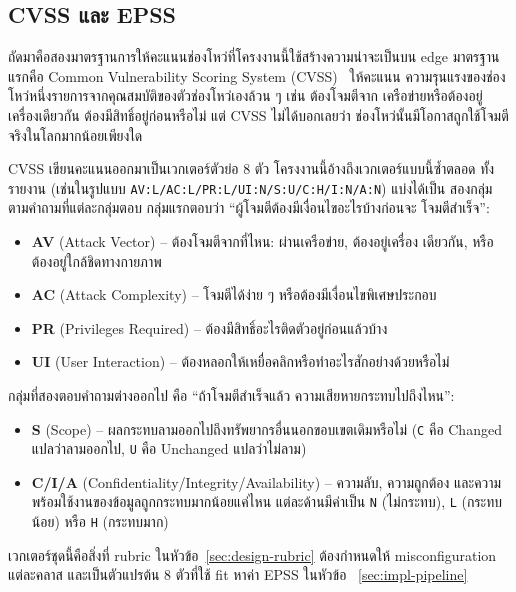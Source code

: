 \subsection{CVSS และ EPSS}\label{sec:theory-cvss-epss}

ถัดมาคือสองมาตรฐานการให้คะแนนช่องโหว่ที่โครงงานนี้ใช้สร้างความน่าจะเป็นบน edge
มาตรฐานแรกคือ Common Vulnerability Scoring System (CVSS)~\cite{cvss31} ให้คะแนน
ความรุนแรงของช่องโหว่หนึ่งรายการจากคุณสมบัติของตัวช่องโหว่เองล้วน ๆ เช่น ต้องโจมตีจาก
เครือข่ายหรือต้องอยู่เครื่องเดียวกัน ต้องมีสิทธิ์อยู่ก่อนหรือไม่ แต่ CVSS ไม่ได้บอกเลยว่า
ช่องโหว่นั้นมีโอกาสถูกใช้โจมตีจริงในโลกมากน้อยเพียงใด

CVSS เขียนคะแนนออกมาเป็นเวกเตอร์ตัวย่อ 8 ตัว โครงงานนี้อ้างถึงเวกเตอร์แบบนี้ซ้ำตลอด
ทั้งรายงาน (เช่นในรูปแบบ \texttt{AV:L/AC:L/PR:L/UI:N/S:U/C:H/I:N/A:N}) แบ่งได้เป็น
สองกลุ่มตามคำถามที่แต่ละกลุ่มตอบ กลุ่มแรกตอบว่า ``ผู้โจมตีต้องมีเงื่อนไขอะไรบ้างก่อนจะ
โจมตีสำเร็จ'':

\begin{itemize}[leftmargin=1.6em]
\item \textbf{AV} (Attack Vector) -- ต้องโจมตีจากที่ไหน: ผ่านเครือข่าย, ต้องอยู่เครื่อง
เดียวกัน, หรือต้องอยู่ใกล้ชิดทางกายภาพ
\item \textbf{AC} (Attack Complexity) -- โจมตีได้ง่าย ๆ หรือต้องมีเงื่อนไขพิเศษประกอบ
\item \textbf{PR} (Privileges Required) -- ต้องมีสิทธิ์อะไรติดตัวอยู่ก่อนแล้วบ้าง
\item \textbf{UI} (User Interaction) -- ต้องหลอกให้เหยื่อคลิกหรือทำอะไรสักอย่างด้วยหรือไม่
\end{itemize}

กลุ่มที่สองตอบคำถามต่างออกไป คือ ``ถ้าโจมตีสำเร็จแล้ว ความเสียหายกระทบไปถึงไหน'':

\begin{itemize}[leftmargin=1.6em]
\item \textbf{S} (Scope) -- ผลกระทบลามออกไปถึงทรัพยากรอื่นนอกขอบเขตเดิมหรือไม่
(\texttt{C} คือ Changed แปลว่าลามออกไป, \texttt{U} คือ Unchanged แปลว่าไม่ลาม)
\item \textbf{C/I/A} (Confidentiality/Integrity/Availability) -- ความลับ, ความถูกต้อง
และความพร้อมใช้งานของข้อมูลถูกกระทบมากน้อยแค่ไหน แต่ละด้านมีค่าเป็น \texttt{N}
(ไม่กระทบ), \texttt{L} (กระทบน้อย) หรือ \texttt{H} (กระทบมาก)
\end{itemize}

เวกเตอร์ชุดนี้คือสิ่งที่ rubric ในหัวข้อ~\ref{sec:design-rubric} ต้องกำหนดให้
misconfiguration แต่ละคลาส และเป็นตัวแปรต้น 8 ตัวที่ใช้ fit หาค่า EPSS ในหัวข้อ~
\ref{sec:impl-pipeline}

